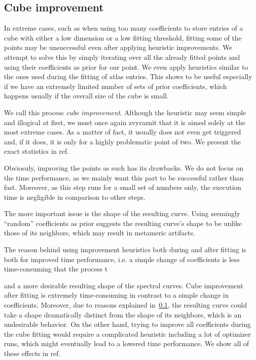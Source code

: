 \subsection{Cube improvement} \label{ssec:cubeImprovement}

In extreme cases, such as when using too many coefficients to store entries of a cube with either a low dimension or a low fitting threshold, fitting some of the points may be unsuccessful even after applying heuristic improvements. We attempt to solve this by simply iterating over all the already fitted points and using their coefficients as prior for our point. We even apply heuristics similar to the ones used during the fitting of atlas entries. This shows to be useful especially if we have an extremely limited number of sets of prior coefficients, which happens usually if the overall size of the cube is small.

We call this process \emph{cube improvement}. Although the heuristic may seem simple and illogical at first, we must once again zvyraznit that it is aimed solely at the most extreme cases. As a matter of fact, it usually does not even get triggered and, if it does, it is only for a highly problematic point of two. We present the exact statistics in ref.

Obviosuly, improving the points as such has its drawbacks. We do not focus on the time performance, as we mainly want this part to be successful rather than fast. Moreover, as this step runs for a small set of numbers only, the execution time is negligible in comparison to other steps.

The more important issue is the shape of the resulting curve. Using seemingly ``random'' coefficients as prior suggests the resulting curve's shape to be unlike those of its neighbors, which may result in metameric artifacts.


The reason behind using improvement heuristics both during and after fitting is both for improved time performance, i.e. a simple change of coefficients is less time-consuming that the process t

and a more desirable resulting shape of the spectral curves. Cube improvement after fitting is extremely time-consuming in contrast to a simple change in coefficients. Moreover, due to reasons explained in~\cref{ssec:cubeImprovement}, the resulting curve could take a shape dramatically distinct from the shape of its neighbors, which is an undesirable behavior. On the other hand, trying to improve all coefficients during the cube fitting would require a complicated heuristic including a lot of optimizer runs, which might eventually lead to a lowered time performance. We show all of these effects in ref.


